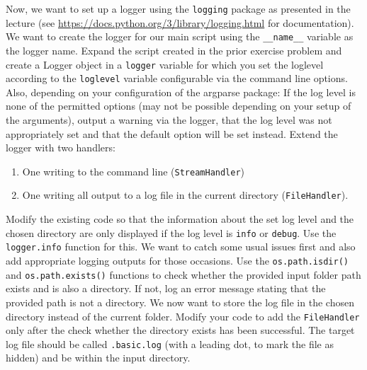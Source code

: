 \documentclass[]{erlangen-problemset}
\begin{document}
\begin{problem}[title={Setting up a logger}]
\noindent
Now, we want to set up a logger using the \texttt{logging} package as presented in the lecture (see \url{https://docs.python.org/3/library/logging.html} for documentation). 
We want to create the logger for our main script using the \texttt{\_\_name\_\_} variable as the logger name.
\Question Expand the script created in the prior exercise problem and create a Logger object in a \texttt{logger} variable for which you set the loglevel according to the \texttt{loglevel} variable configurable via the command line options. 
Also, depending on your configuration of the argparse package: 
If the log level is none of the permitted options (may not be possible depending on your setup of the arguments), output a warning via the logger, that the log level was not appropriately set and that the default option will be set instead.
\Question Extend the logger with two handlers: 
\begin{enumerate}
	\item One writing to the command line (\texttt{StreamHandler})
	\item One writing all output to a log file in the current directory (\texttt{FileHandler}).
\end{enumerate}
\Question Modify the existing code so that the information about the set log level and the chosen directory are only displayed if the log level is \texttt{info} or \texttt{debug}. 
Use the \texttt{logger.info} function for this. 
\Question We want to catch some usual issues first and also add appropriate logging outputs for those occasions. 
Use the \texttt{os.path.isdir()} and \texttt{os.path.exists()} functions to check whether the provided input folder path exists and is also a directory. 
If not, log an error message stating that the provided path is not a directory.
\Question We now want to store the log file in the chosen directory instead of the current folder. 
Modify your code to add the \texttt{FileHandler} only after the check whether the directory exists has been successful. 
The target log file should be called \texttt{.basic.log} (with a leading dot, to mark the file as hidden) and be within the input directory.
\end{problem}
\end{document}
